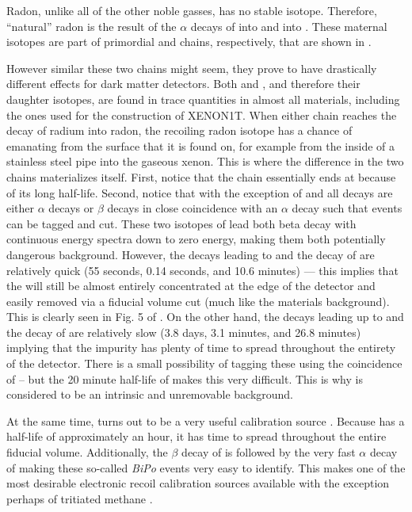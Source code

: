 Radon, unlike all of the other noble gasses, has no stable isotope.  Therefore, ``natural'' radon is the result of the $\alpha$ decays of  into \radon{} and  into .  These maternal isotopes are part of primordial  and  chains, respectively, that are shown in .  

However similar these two chains might seem, they prove to have drastically different effects for dark matter detectors.  Both \uranium{} and \thorium{}, and therefore their daughter isotopes, are found in trace quantities in almost all materials, including the ones used for the construction of XENON1T.  When either chain reaches the decay of radium into radon, the recoiling radon isotope has a chance of emanating from the surface that it is found on, for example from the inside of a stainless steel pipe into the gaseous xenon.  This is where the difference in the two chains materializes itself.  First, notice that the \uranium{} chain essentially ends at  because of its long half-life.  Second, notice that with the exception of  and  all decays are either $\alpha$ decays or $\beta$ decays in close coincidence with an $\alpha$ decay such that events can be tagged and cut.  These two isotopes of lead both beta decay with continuous energy spectra down to zero energy, making them both potentially dangerous background.  However, the decays leading to and the decay of  are relatively quick (55 seconds, 0.14 seconds, and 10.6 minutes) --- this implies that the  will still be almost entirely concentrated at the edge of the detector and easily removed via a fiducial volume cut (much like the materials background).  This is clearly seen in Fig. 5 of .  On the other hand, the decays leading up to and the decay of  are relatively slow (3.8 days, 3.1 minutes, and 26.8 minutes) implying that the impurity has plenty of time to spread throughout the entirety of the detector.  There is a small possibility of tagging these  using the coincidence of -- but the 20 minute half-life of  makes this very difficult.  This is why \radon{} is considered to be an intrinsic and unremovable background.

At the same time,  turns out to be a very useful calibration source \cite{aprile2017results}.  Because  has a half-life of approximately an hour, it has time to spread throughout the entire fiducial volume.  Additionally, the $\beta$ decay of  is followed by the very fast $\alpha$ decay of  making these so-called \textit{BiPo} events very easy to identify.  This makes  one of the most desirable electronic recoil calibration sources available with the exception perhaps of tritiated methane \cite{akerib2016tritium, aprile2017tritium}.


